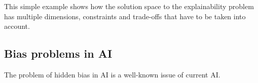 \documentclass[conference]{IEEEtran}
\newcommand{\cit}[1][]{\todo[tickmarkheight=0.2cm]{cit #1}}
\begin{document}



This simple example shows how the solution space to the explainability problem
has multiple dimensions, constraints and trade-offs that have to be taken into
account.

\subsection{Bias problems in AI}
\label{sec:bias}

The problem of hidden bias in AI is a well-known issue of current AI.




\end{document}

